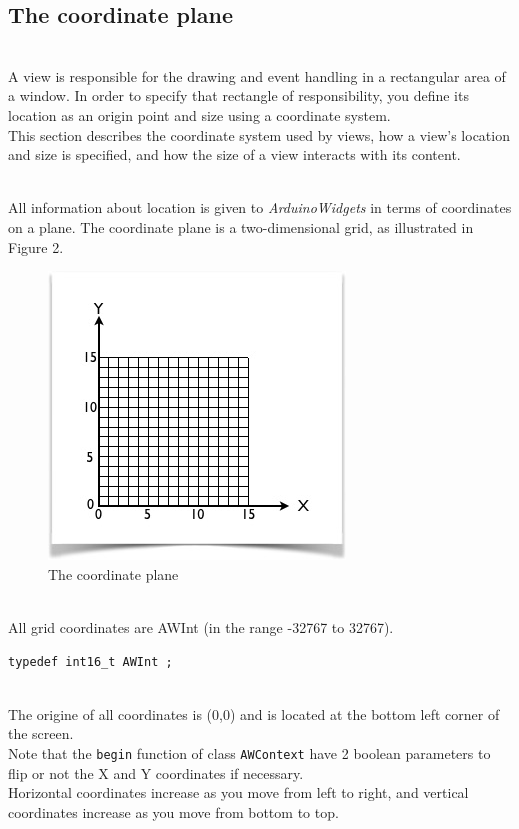 \documentclass[a4paper,11pt]{extarticle}
\begin{document}
\newpage
\subsection{The coordinate plane}

~\\ A view is responsible for the drawing and event handling in a rectangular area of a window. In order to specify that rectangle of responsibility, you define its location as an origin point and size using a coordinate system.
~\\This section describes the coordinate system used by views, how a view's location and size is specified, and how the size of a view interacts with its content.

~\\ All information about location is given to \emph{ArduinoWidgets} in terms of coordinates on a plane. The coordinate plane is a two-dimensional grid, as illustrated in Figure 2.

\begin{figure}[htbp]
   \centering
   \includegraphics[scale=1]{AWFig2.png} 
   \caption{The coordinate plane}
   \label{fig:2 }
\end{figure}

~\\All grid coordinates are AWInt (in the range -32767 to 32767).

\begin{lstlisting}[language=Arduinonl]
typedef int16_t AWInt ;
\end{lstlisting}

~\\The origine of all coordinates is (0,0) and is located at the bottom left corner of the screen.
~\\ Note that  the \texttt{begin} function of class \texttt{AWContext} have 2 boolean parameters to flip or not the X and Y coordinates if necessary.
~\\Horizontal coordinates increase as you move from left to right, and vertical coordinates increase as you move from bottom to top. 
\end{document}
